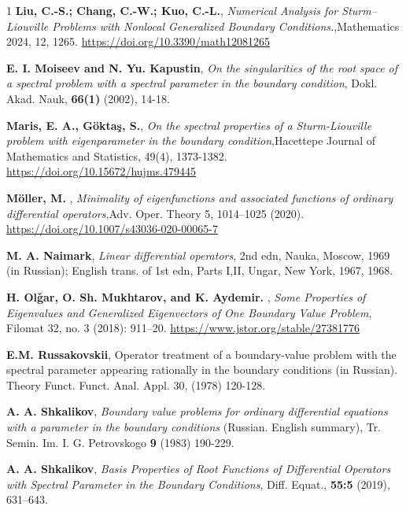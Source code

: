 \documentclass[pdflatex,sn-mathphys-num]{sn-jnl}%
\theoremstyle{thmstyleone}%
\theoremstyle{thmstyletwo}%
\theoremstyle{thmstylethree}%
\theoremstyle{definition}
\theoremstyle{remark}
\numberwithin{equation}{section}
\begin{document}
\begin{thebibliography}{1}
\textbf{Liu, C.-S.; Chang, C.-W.; Kuo, C.-L.}, \textit{Numerical Analysis for Sturm–Liouville Problems with Nonlocal Generalized Boundary Conditions.},Mathematics 2024, 12, 1265. \url{https://doi.org/10.3390/math12081265}

\textbf{E. I. Moiseev and N. Yu. Kapustin}, \textit{On the singularities of the root space of a spectral problem
with a spectral parameter in the boundary condition}, Dokl. Akad.
Nauk, \textbf{66(1)} (2002), 14-18. 

\textbf{Maris, E. A., Göktaş, S.}, \textit{On the spectral properties of a Sturm-Liouville problem with eigenparameter in the boundary condition},Hacettepe Journal of Mathematics and Statistics, 49(4), 1373-1382.
\url{https://doi.org/10.15672/hujms.479445}

\textbf{Möller, M. }, \textit{Minimality of eigenfunctions and associated functions of ordinary differential operators},Adv. Oper. Theory 5, 1014–1025 (2020).
\url{https://doi.org/10.1007/s43036-020-00065-7}


\textbf{M. A. Naimark}, \textit{Linear differential operators},
2nd edn, Nauka, Moscow, 1969 (in Russian); English trans. of 1st
edn, Parts I,II, Ungar, New York, 1967, 1968.

\textbf{H. Olǧar, O. Sh. Mukhtarov, and K. Aydemir. }, \textit{Some Properties of Eigenvalues and Generalized Eigenvectors of One Boundary Value Problem},
Filomat 32, no. 3 (2018): 911–20. \url{https://www.jstor.org/stable/27381776}



\textbf{E.M. Russakovskii},  Operator treatment of a boundary-value problem with the spectral parameter appearing rationally in the boundary conditions (in Russian). Theory Funct. Funct. Anal. Appl. 30, (1978) 120-128.

\textbf{A. A. Shkalikov}, \textit{Boundary value problems for ordinary differential equations with a parameter in the boundary conditions} (Russian. English summary), Tr. Semin. Im. I. G. Petrovskogo \textbf{9} (1983) 190-229.

\textbf{A. A. Shkalikov}, \textit{Basis Properties of Root Functions of Differential Operators with Spectral Parameter in the Boundary Conditions}, Diff. Equat., \textbf{55:5} (2019), 631–643.






\end{thebibliography}

\end{document}
